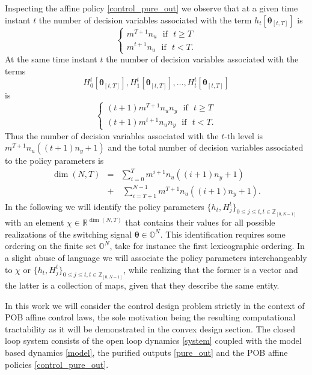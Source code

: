 \documentclass[letterpaper,11pt]{article}
\begin{document}
Inspecting the affine policy \eqref{control_pure_out} we observe that at a given time instant $t$ the number of decision variables 
associated with the term $h_{t}[\bm{\theta}_{[t,T]}]$ 
is 
$$
\begin{cases}
m^{T+1}   n_u ~~~ \text{if}~~~ t \geq T \\
m^{t+1}    n_u ~~~ \text{if}~~~ t <  T.
\end{cases}
$$
At the same time instant $t$ the number of decision variables 
associated with the terms 
$$ H_0^t[\bm{\theta}_{[t,T]}], H_1^t[\bm{\theta}_{[t,T]}], 
\hdots, H_t^t[\bm{\theta}_{[t,T]}]$$
is 
$$
\begin{cases}
(t+1)   m^{T+1}  n_u  n_y ~~~ \text{if}~~~ t \geq T \\
(t+1)    m^{t+1}     n_u  n_y~~~ \text{if}~~~ t <  T.
\end{cases}
$$
Thus the  number of decision variables associated with the $t$-th level is
$
m^{T+1}    n_u  ( (t+1)   n_y + 1)
$
and the total number of decision variables associated to the policy parameters is 
\begin{eqnarray}
\nonumber
\label{dimension}
\dim(N,T) & = & \sum_{i=0}^T m^{i+1} n_u ( (i+1)   n_y + 1) \\~ &+& ~  \sum_{i=T+1}^{N-1} m^{T+1}   n_u 
( (i+1)    n_y + 1).
\end{eqnarray}
In the following we will identify the policy parameters $ \{ h_{t}, H_j^t \}_{0 \leq j \leq t, t \in \mathbb{Z}_{[0,N-1]}} $ with an element 
$ \chi \in \mathbb{R}^{\dim(N,T)}$ that contains their values for all possible realizations of the switching signal $ \bm{\theta} \in 
\mathbb{O}^N$. This identification requires some ordering on the finite set $ \mathbb{O}^N$, 
take for instance the first lexicographic ordering.  
In a slight abuse of language we will associate  the policy parameters interchangeably to
$ \chi$
or 
$\{ h_{t}, H_j^t \}_{0 \leq j \leq t, t \in \mathbb{Z}_{[0,N-1]}}$,
while realizing that the former is a vector and  the latter 
is a collection of maps, given that they describe the same entity. 

In this work we will  consider the control design problem strictly in the context of POB affine control laws, the sole motivation being the resulting computational tractability as it will be demonstrated in the convex design section. The closed loop system consists of 
the  open loop dynamics  \eqref{system} coupled with the model based dynamics  \eqref{model}, the purified outputs \eqref{pure_out} and the POB affine policies \eqref{control_pure_out}.
\end{document}
